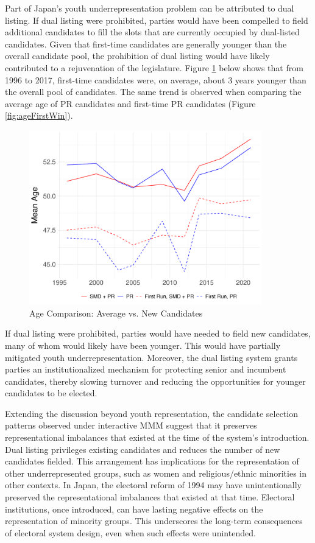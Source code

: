 \documentclass[a4paper, 11pt]{article}
\begin{document}


Part of Japan’s youth underrepresentation problem can be attributed to dual listing. If dual listing were prohibited, parties would have been compelled to field additional candidates to fill the slots that are currently occupied by dual-listed candidates. Given that first-time candidates are generally younger than the overall candidate pool, the prohibition of dual listing would have likely contributed to a rejuvenation of the legislature. Figure \ref{fig:ageFirstRun} below shows that from 1996 to 2017, first-time candidates were, on average, about 3 years younger than the overall pool of candidates. The same trend is observed when comparing the average age of PR candidates and first-time PR candidates (Figure \ref{fig:ageFirstWin}).

\begin{figure}[!htbp]
	\includegraphics[width = 0.9\textwidth]{../figure/paper/age_first_run.pdf}
	\caption{Age Comparison: Average vs. New Candidates}
	\label{fig:ageFirstRun}
\end{figure}

If dual listing were prohibited, parties would have needed to field new candidates, many of whom would likely have been younger. This would have partially mitigated youth underrepresentation. Moreover, the dual listing system grants parties an institutionalized mechanism for protecting senior and incumbent candidates, thereby slowing turnover and reducing the opportunities for younger candidates to be elected.

Extending the discussion beyond youth representation, the candidate selection patterns observed under interactive MMM suggest that it preserves representational imbalances that existed at the time of the system’s introduction. Dual listing privileges existing candidates and reduces the number of new candidates fielded. This arrangement has implications for the representation of other underrepresented groups, such as women and religious/ethnic minorities in other contexts. In Japan, the electoral reform of 1994 may have unintentionally preserved the representational imbalances that existed at that time. Electoral institutions, once introduced, can have lasting negative effects on the representation of minority groups. This underscores the long-term consequences of electoral system design, even when such effects were unintended.
\end{document}
